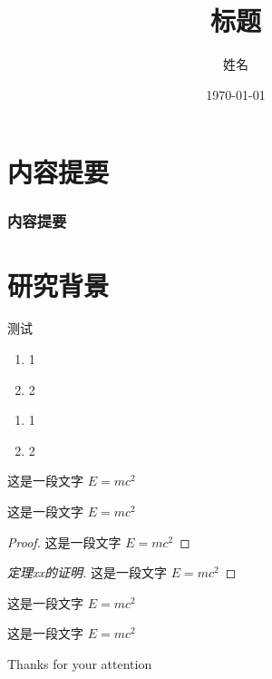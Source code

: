 \documentclass{whu-beamer}
\title[硕士毕业论文开题报告答辩]{标题}
\author[name]{姓名}
\institute[WHU]{武汉大学数学与统计学院}
\date{\today}
\begin{document}
\maketitle


\section{内容提要}

\begin{frame}
  \frametitle{内容提要}
  \tableofcontents[hideallsubsections]
\end{frame}



\section{研究背景}
\begin{frame}{测试}
  \begin{enumerate}[i]
    \item 1
    \item 2
  \end{enumerate}
  \begin{enumerate}[a]
    \item 1
    \item 2
  \end{enumerate}
\end{frame}

\begin{frame}
  \begin{definition}
    这是一段文字 $E = m c^2$
  \end{definition}
  
  \begin{theorem}
    这是一段文字 $E = m c^2$
  \end{theorem}
  
  
  \begin{proof}
    这是一段文字 $E = m c^2$
  \end{proof}
  
  \begin{proof}[定理xx的证明]
    这是一段文字 $E = m c^2$
  \end{proof}
  
\end{frame}

\begin{frame}
  \begin{example}
    这是一段文字 $E = m c^2$
  \end{example}
  
  \begin{corollary}
    这是一段文字 $E = m c^2$
  \end{corollary}
\end{frame}



\begin{acknowledgements}[color = blue!80]
  Thanks for your attention
\end{acknowledgements}
\end{document}
